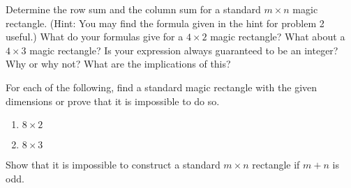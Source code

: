 \documentclass[11pt]{article}
\renewenvironment{problem}{\begin{problems}}{\end{problems}\vspace{5pt}}
\begin{document}
\begin{problem}[6 points]
Determine the row sum and the column sum for a standard $m \times n$ magic rectangle.
(Hint: You may find the formula given in the hint for problem 2 useful.)
What do your formulas give for a $4 \times 2$ magic rectangle? What about a $4 \times 3$ magic rectangle?
Is your expression always guaranteed to be an integer? Why or why not?
What are the implications of this?
\end{problem}

\begin{problem}[8=4+4 points]
For each of the following, find a standard magic rectangle with the given dimensions or prove that it is impossible to do so.
\begin{enumerate}[label=(\alph*)]
\item $8 \times 2$

\item $8 \times 3$
\end{enumerate}
\end{problem}

\begin{problem}[5 points]
Show that it is impossible to construct a standard $m \times n$ rectangle if $m+n$ is odd.
\end{problem}
\end{document}
